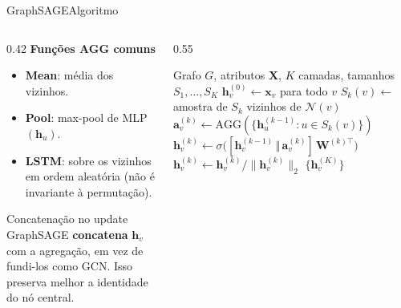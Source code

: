 \documentclass[aspectratio=169,xcolor=dvipsnames]{beamer}
\begin{document}
  \begin{frame}{GraphSAGE}{Algoritmo}
    \begin{columns}[T]
      \begin{column}{0.42\textwidth}
        \textbf{Funções AGG comuns}
        \begin{itemize}
          \item \textbf{Mean}: média dos vizinhos.
          \item \textbf{Pool}: max-pool de MLP$(\mathbf{h}_u)$.
          \item \textbf{LSTM}: sobre os vizinhos em ordem aleatória (não é
                invariante à permutação).
        \end{itemize}

        \vspace{0.5em}
        \begin{alertblock}{Concatenação no update}
          GraphSAGE \textbf{concatena} $\mathbf{h}_v$ com a agregação, em vez de fundi-los
          como GCN. Isso preserva melhor a identidade do nó central.
        \end{alertblock}
      \end{column}
      \begin{column}{0.55\textwidth}
        \begin{algorithmic}[1]
          \Require Grafo $G$, atributos $\mathbf{X}$, $K$ camadas, tamanhos $S_1,\ldots,S_K$
          \State $\mathbf{h}^{(0)}_v \gets \mathbf{x}_v$ para todo $v$
              \State $S_k(v) \gets$ amostra de $S_k$ vizinhos de $\mathcal{N}(v)$
              \State $\mathbf{a}^{(k)}_v \gets \mathrm{AGG}(\{\mathbf{h}^{(k-1)}_u : u \in S_k(v)\})$
              \State $\mathbf{h}^{(k)}_v \gets \sigma\!\bigl([\mathbf{h}^{(k-1)}_v \,\Vert\, \mathbf{a}^{(k)}_v]\, \mathbf{W}^{(k)\top}\bigr)$
              \State $\mathbf{h}^{(k)}_v \gets \mathbf{h}^{(k)}_v / \|\mathbf{h}^{(k)}_v\|_2$
            \EndFor
          \EndFor
          \State \Return $\{\mathbf{h}^{(K)}_v\}$
        \end{algorithmic}
      \end{column}
    \end{columns}
  \end{frame}
\end{document}
